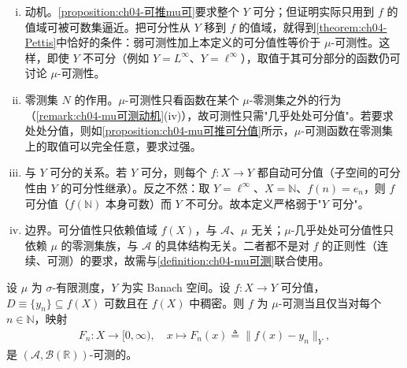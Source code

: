 \documentclass[../../main.tex]{subfiles}%
\begin{document}
\begin{remark}\label{remark:ch04-可分值动机}
\begin{enumerate}[(i)]
\item 动机。\cref{proposition:ch04-可推mu可}要求整个 $Y$ 可分；但证明实际只用到 $f$ 的值域可被可数集逼近。把可分性从 $Y$ 移到 $f$ 的值域，就得到\cref{theorem:ch04-Pettis}中恰好的条件：弱可测性加上本定义的可分值性等价于 $\mu$-可测性。这样，即使 $Y$ 不可分（例如 $Y=L^\infty$、$Y=\ell^\infty$），取值于其可分部分的函数仍可讨论 $\mu$-可测性。
\item 零测集 $N$ 的作用。$\mu$-可测性只看函数在某个 $\mu$-零测集之外的行为（\cref{remark:ch04-mu可测动机}(iv)），故可测性只需"几乎处处可分值"。若要求处处分值，则如\cref{proposition:ch04-mu可推可分值}所示，$\mu$-可测函数在零测集上的取值可以完全任意，要求过强。
\item 与 $Y$ 可分的关系。若 $Y$ 可分，则每个 $f:X\to Y$ 都自动可分值（子空间的可分性由 $Y$ 的可分性继承）。反之不然：取 $Y=\ell^\infty$、$X=\mathbb{N}$、$f(n)=e_n$，则 $f$ 可分值（$f(\mathbb{N})$ 本身可数）而 $Y$ 不可分。故本定义严格弱于"$Y$ 可分"。
\item 边界。可分值性只依赖值域 $f(X)$，与 $\mathcal{A}$、$\mu$ 无关；$\mu$-几乎处处可分值性只依赖 $\mu$ 的零测集族，与 $\mathcal{A}$ 的具体结构无关。二者都不是对 $f$ 的正则性（连续、可测）的要求，故需与\cref{definition:ch04-mu可测}联合使用。
\end{enumerate}
\end{remark}

\begin{proposition}\label{proposition:ch04-可分值判据}
设 $\mu$ 为 $\sigma$-有限测度，$Y$ 为实 Banach 空间。设 $f:X\to Y$ 可分值，$D\equiv\{y_n\}\subseteq f(X)$ 可数且在 $f(X)$ 中稠密。则 $f$ 为 $\mu$-可测当且仅当对每个 $n\in\mathbb{N}$，映射
\begin{align*}
F_n:X\to[0,\infty),\quad x\mapsto F_n(x)\triangleq \|f(x)-y_n\|_Y,
\end{align*}
是 $(\mathcal{A},\mathcal{B}(\mathbb{R}))$-可测的。
\end{proposition}
\end{document}
